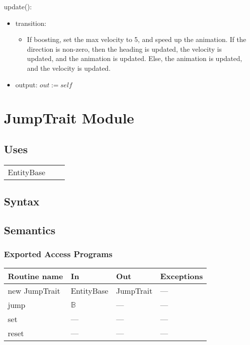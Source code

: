 \documentclass[12pt]{article}
\begin{document}
update():
\begin{itemize}
    \item transition: 
    \begin{itemize}[]
        \item If boosting, set the max velocity to 5, and speed up the animation. If the direction is non-zero, then the heading is updated, the velocity is updated, and the animation is updated. Else, the animation is updated, and the velocity is updated.
    \end{itemize}
    \item output: $out := self$
\end{itemize}

\newpage

\section*{JumpTrait Module}

\subsection* {Uses}

\begin{tabular}{lll}
    EntityBase & & \\
\end{tabular}

\subsection* {Syntax}

\subsection* {Semantics}

\subsubsection* {Exported Access Programs}

\begin{tabular}{| l | l | l | l |}
\hline
\textbf{Routine name} & \textbf{In} & \textbf{Out} & \textbf{Exceptions}\\
\hline
new JumpTrait & EntityBase & JumpTrait & ---\\
\hline
jump & $\mathbb{B}$ & --- & ---\\
\hline
set & --- & --- & ---\\
\hline
reset & --- & --- & ---\\
\hline
\end{tabular}
\end{document}
